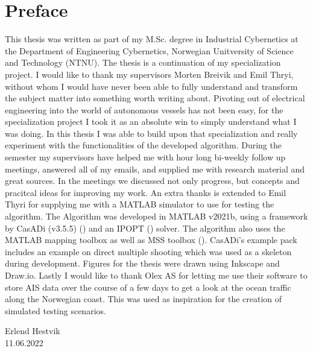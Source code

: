 \newpage

\section*{Preface}

This thesis was written as part of my M.Sc. degree in Industrial Cybernetics
at the Department of Engineering Cybernetics, Norwegian Unitversity of Science
and Technology (NTNU). The thesis is a continuation of my specialization project.
I would like to thank my supervisors Morten Breivik and Emil Thryi, without whom I would have
never been able to fully understand and transform the subject matter into something worth writing about.\newline
Pivoting out of electrical engineering into the world of autonomous vessels has not been easy, for
the specialization project I took it as an absolute win to simply understand what I was doing. In this 
thesis I was able to build upon that specialization and really experiment with the functionalities of the developed
algorithm.\newline
During the semester my supervisors have helped me with hour long bi-weekly follow up meetings, answered
all of my emails, and supplied me with research material and great sources. In the meetings we discussed
not only progress, but concepts and pracitcal ideas for improving my work.\newline
An extra thanks is extended to Emil Thyri for supplying me with a MATLAB simulator to use for testing the algorithm.
The Algorithm was developed in MATLAB v2021b, using a framework by CasADi (v3.5.5) (\cite{andersson2019casadi}) and an IPOPT (\cite{wachter2006implementation}) solver. The algorithm
also uses the MATLAB mapping toolbox as well as MSS toolbox (\cite{MSStoolbox}). CasADi's example pack includes an example on 
direct multiple shooting which was used as a skeleton during development. Figures for the thesis were drawn
using Inkscape and Draw.io. Lastly I would like to thank Olex AS for letting me use their software to store AIS data
over the course of a few days to get a look at the ocean traffic along the Norwegian coast. This was used as inspiration
for the creation of simulated testing scenarios.


\begin{center}
    Erlend Hestvik\\
    11.06.2022
\end{center}

\afterpage{\blankpage}